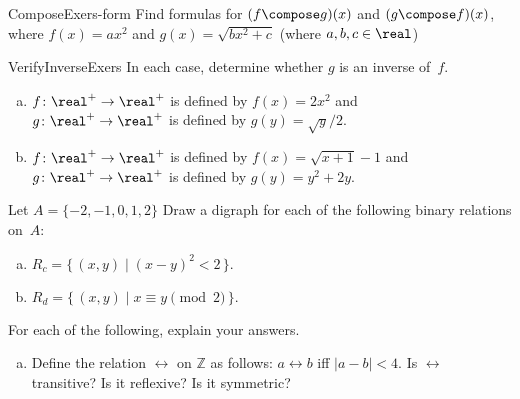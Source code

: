 
\begin{exercise}{ComposeExers-form} 
Find formulas for $(f \compose g)(x)$ and $(g \compose f)(x)$, where 
 $f(x) = ax^2 $ and $g(x) = \sqrt{b x^2 + c}$ (where $a,b,c \in \real$)
\end{exercise}

 \begin{exercise}{VerifyInverseExers}
 In each case, determine whether $g$ is an inverse of~$f$.
 \begin{enumerate}[(a)]
 \item \label{VerifyInverseExers-(x^2)}
$f \colon \real^+ \to \real^+$ is defined by $f(x) =2x^2$ and 
 \\ $g \colon \real^+ \to \real^+$ is defined by $g(y) = \sqrt{y}/2$.
 \item \label{VerifyInverseExers-(sqrt(x+1)-1)}
$f \colon \real^+ \to \real^+$ is defined by $f(x) = \sqrt{x+1} - 1$ and 
 \\ $g \colon \real^+ \to \real^+$ is defined by $g(y) = y^2 + 2y$.
 \end{enumerate}
 \end{exercise}

\begin{exer} \label{DrawBinRelExer}
Let $A =  \{-2,-1,0,1,2\}$ Draw a digraph for each of the following binary relations on~$A$: 
 \begin{enumerate}[(a)]
 \item \label{DrawBinRelExer-married}
 $ R_c = \{\, (x,y) \mid  (x-y)^2 < 2 \,\} .$
  \item \label{DrawBinRelExer-lived}
$ R_d = \{\, (x,y) \mid  x\equiv y \pmod{2} \,\} .$
 \end{enumerate}
 \end{exer}

\begin{exercise}{17}
For each of the following, explain your answers. 
\begin{enumerate}[(a)]
\item Define the relation $\rel$ on $\mathbb{Z}$ as follows: $ a \rel b$ iff $|a - b|< 4$. Is $\rel$ transitive? Is it reflexive? Is it symmetric?
\end{enumerate}
\end{exercise}

